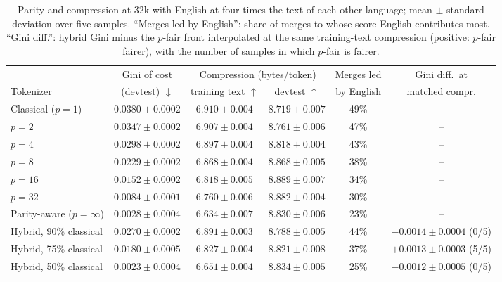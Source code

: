 \begin{table}[t]
\centering
\small
\begin{tabular}{lccccc}
\toprule
 & Gini of cost & \multicolumn{2}{c}{Compression (bytes/token)} & Merges led & Gini diff.\ at\\
\cmidrule(lr){3-4}
Tokenizer & (devtest) $\downarrow$ & training text $\uparrow$ & devtest $\uparrow$ & by English & matched compr.\\
\midrule
Classical ($p=1$) & $0.0380\pm0.0002$ & $6.910\pm0.004$ & $8.719\pm0.007$ & 49\% & --\\
$p=2$  & $0.0347\pm0.0002$ & $6.907\pm0.004$ & $8.761\pm0.006$ & 47\% & --\\
$p=4$  & $0.0298\pm0.0002$ & $6.897\pm0.004$ & $8.818\pm0.004$ & 43\% & --\\
$p=8$  & $0.0229\pm0.0002$ & $6.868\pm0.004$ & $8.868\pm0.005$ & 38\% & --\\
$p=16$ & $0.0152\pm0.0002$ & $6.818\pm0.005$ & $8.889\pm0.007$ & 34\% & --\\
$p=32$ & $0.0084\pm0.0001$ & $6.760\pm0.006$ & $8.882\pm0.004$ & 30\% & --\\
Parity-aware ($p=\infty$) & $0.0028\pm0.0004$ & $6.634\pm0.007$ & $8.830\pm0.006$ & 23\% & --\\
\midrule
Hybrid, 90\% classical & $0.0270\pm0.0002$ & $6.891\pm0.003$ & $8.788\pm0.005$ & 44\% & $-0.0014\pm0.0004$ (0/5)\\
Hybrid, 75\% classical & $0.0180\pm0.0005$ & $6.827\pm0.004$ & $8.821\pm0.008$ & 37\% & $+0.0013\pm0.0003$ (5/5)\\
Hybrid, 50\% classical & $0.0023\pm0.0004$ & $6.651\pm0.004$ & $8.834\pm0.005$ & 25\% & $-0.0012\pm0.0005$ (0/5)\\
\bottomrule
\end{tabular}
\caption{Parity and compression at 32k with English at four times the text of each other
language; mean $\pm$ standard deviation over five samples. ``Merges led by English'': share
of merges to whose score English contributes most. ``Gini diff.'': hybrid Gini minus the
$p$-fair front interpolated at the same training-text compression (positive: $p$-fair
fairer), with the number of samples in which $p$-fair is fairer.}
\label{tab:front}
\end{table}


